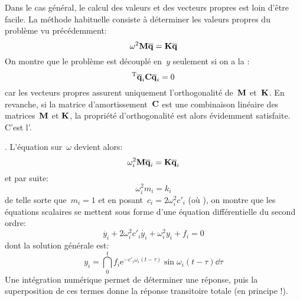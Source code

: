 Dans le cas général, le calcul des valeurs et des vecteurs propres  est loin d'être facile. La méthode habituelle consiste à déterminer les valeurs propres  du problème vu précédemment:
\begin{equation} \omega^2\MM{M}\VV{\overline{q}}=\MM{K}\VV{\overline{q}} \end{equation}
On montre que le problème est découplé en~$y$ seulement si on a la : \begin{equation}\LL{\overline{q}}_i\MM{C}\VV{\overline{q}}_i=0\end{equation}
\medskipvm
{} car les vecteurs propres assurent uniquement l'orthogonalité de~$\MM{M}$ et~$\MM{K}$.
\medskipvm
En revanche, si la matrice d'amortissement~$\MM{C}$ est une combinaison linéaire des matrices~$\MM{M}$ et $\MM{K}$, la propriété d'orthogonalité est alors évidemment satisfaite. C'est l'.

.
L'équation sur~$\omega$ devient alors:
\begin{equation} \omega_i^2\MM{M}\VV{\overline{q}}_i =\MM{K}\VV{\overline{q}}_i \end{equation}
et par suite:
\begin{equation} \omega_i^2m_i = k_i\end{equation}
\medskipvm
{} de telle sorte que~$m_i=1$ et en posant~$c_i = 2\omega_i^2c'_i$ (où ), on montre que les équations scalaires se mettent sous forme d'une équation différentielle du second ordre:
\begin{equation} \ddot{y_i}+2\omega_i^2c'_i \dot{y_i} + \omega_i^2y_i + f_i = 0 \end{equation}
dont la solution générale est:
\begin{equation} y_i = \dint_0^t f_i \mathrm{e}^{-c'_i\omega_i(t-\tau)}\sin \omega_i (t-\tau) \dd\tau \end{equation}
\medskipvm
Une intégration numérique permet de déterminer une réponse, puis la superposition de ces termes donne la réponse transitoire totale (en principe !).
\medskipvm
{}

